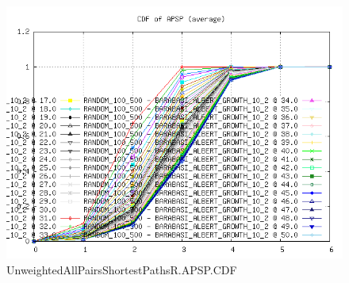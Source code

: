 \begin{figure} [h]
	\centering
	\includegraphics [scale=0.8] {plots/UnweightedAllPairsShortestPathsR.APSP.CDF}
	\caption{UnweightedAllPairsShortestPathsR.APSP.CDF}
	\label{plot:RANDOM_100_500 - BARABASI_ALBERT_GROWTH_10_2.UnweightedAllPairsShortestPathsR.APSP.CDF}
\end{figure}

